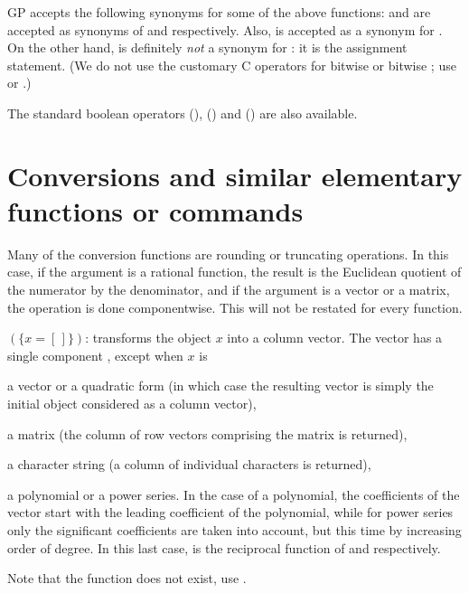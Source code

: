 GP accepts the following synonyms for some of the above functions:
\kbd{|} and \kbd{\&} are accepted as
synonyms of \kbd{||} and \kbd{\&\&} respectively. Also, \kbd{<>} is accepted
as a synonym for \kbd{!=}. On the other hand, \kbd{=} is definitely
\emph{not} a synonym for \kbd{==}: it is the assignment statement. (We do not
use the customary C operators for bitwise  or bitwise ; use
 or .)

The standard boolean operators \kbd{||} (), \kbd{\&\&}
() and \kbd{!} () are also available.

\section{Conversions and similar elementary functions or commands}
\label{se:conversion}

\noindent
Many of the conversion functions are rounding or truncating operations. In
this case, if the argument is a rational function, the result is the
Euclidean quotient of the numerator by the denominator, and if the argument
is a vector or a matrix, the operation is done componentwise. This will not
be restated for every function.


$(\{x=[\,]\})$: \label{se:Col}
transforms the object $x$ into a column vector.
The vector has a single component , except when $x$ is

\item a vector or a quadratic form (in which case the resulting vector is
simply the initial object considered as a column vector),

\item a matrix (the column of row vectors comprising the matrix is
returned),

\item a character string (a column of individual characters is returned),

\item a polynomial or a power series. In the case of a polynomial, the
coefficients of the vector start with the leading coefficient of the
polynomial, while for power series only the significant coefficients are
taken into account, but this time by increasing order of degree. In this last
case,  is the reciprocal function of  and 
respectively.

Note that the function  does not exist, use .

